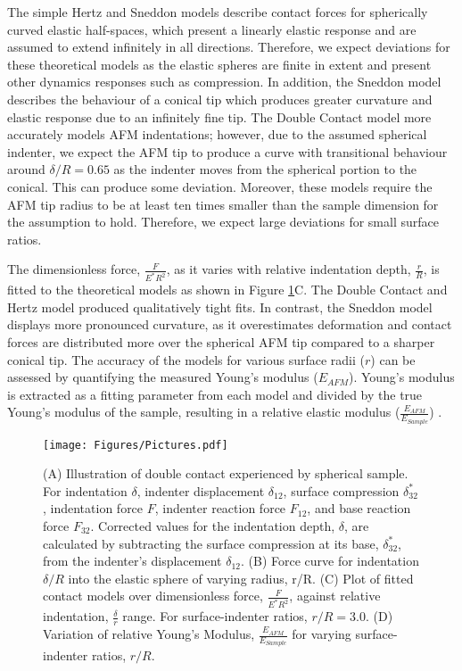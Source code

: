 The simple Hertz and Sneddon models describe contact forces for spherically curved elastic half-spaces, which present a linearly elastic response\cite{kontomaris2019determination} and are assumed to extend infinitely in all directions\cite{kontomaris2019harmonic}. Therefore, we expect deviations for these theoretical models as the elastic spheres are finite in extent and present other dynamics responses such as compression. In addition, the Sneddon model describes the behaviour of a conical tip which produces greater curvature and elastic response due to an infinitely fine tip. The Double Contact model more accurately models AFM indentations; however, due to the assumed spherical indenter, we expect the AFM tip to produce a curve with transitional behaviour around $\delta/R=0.65$ as the indenter moves from the spherical portion to the conical. This can produce some deviation. Moreover, these models require the AFM tip radius to be at least ten times smaller than the sample dimension for the assumption to hold. Therefore, we expect large deviations for small surface ratios.

The dimensionless force, $\frac{F}{E^*R^2}$, as it varies with relative indentation depth, $\frac{r}{R}$, is fitted to the theoretical models as shown in Figure \ref{fig: Capped-Sphere-Plot}C. The Double Contact and Hertz model produced qualitatively tight fits. In contrast, the Sneddon model displays more pronounced curvature, as it overestimates deformation and contact forces are distributed more over the spherical AFM tip compared to a sharper conical tip. The accuracy of the models for various surface radii ($r$) can be assessed by quantifying the measured Young's modulus ($E_{AFM}$). Young's modulus is extracted as a fitting parameter from each model and divided by the true Young's modulus of the sample, resulting in a relative elastic modulus ($\frac{E_{AFM}}{E_{Sample}}$) \cite{sun2021determination, DIMITRIADIS20022798, kontomaris2019determination}.

\begin{figure}[htp]
    \centering
    \texttt{[image: Figures/Pictures.pdf]} 
    \caption{\label{fig: Capped-Sphere-Plot} (A) Illustration of double contact experienced by spherical sample. For indentation $\delta$, indenter displacement $\delta_{12}$, surface compression $\delta^*_{32}$, indentation force $F$, indenter reaction force $F_{12}$, and base reaction force $F_{32}$. Corrected values for the indentation depth, $\delta$, are calculated by subtracting the surface compression at its base, $\delta^*_{32}$, from the indenter's displacement $\delta_{12}$. (B) Force curve for indentation $\delta/R$ into the elastic sphere of varying radius, r/R. (C) Plot of fitted contact models over  dimensionless force, $\frac{F}{E^*R^2}$, against relative indentation, $\frac{\delta}{r}$ range. For surface-indenter ratios, $r/R = 3.0$. (D) Variation of relative Young's Modulus, $\frac{E_{AFM}}{E_{Sample}}$ for varying surface-indenter ratios, $r/R$.}
\end{figure}


